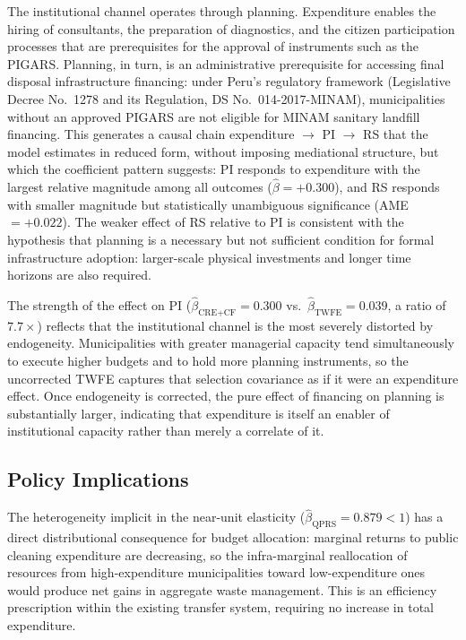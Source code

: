 The institutional channel operates through planning. Expenditure enables the hiring of consultants, the preparation of diagnostics, and the citizen participation processes that are prerequisites for the approval of instruments such as the PIGARS. Planning, in turn, is an administrative prerequisite for accessing final disposal infrastructure financing: under Peru's regulatory framework (Legislative Decree No.\ 1278 and its Regulation, DS No.\ 014-2017-MINAM), municipalities without an approved PIGARS are not eligible for MINAM sanitary landfill financing. This generates a causal chain expenditure $\to$ PI $\to$ RS that the model estimates in reduced form, without imposing mediational structure, but which the coefficient pattern suggests: PI responds to expenditure with the largest relative magnitude among all outcomes ($\hat{\beta} = +0.300$), and RS responds with smaller magnitude but statistically unambiguous significance (AME $= +0.022$). The weaker effect of RS relative to PI is consistent with the hypothesis that planning is a necessary but not sufficient condition for formal infrastructure adoption: larger-scale physical investments and longer time horizons are also required.

The strength of the effect on PI ($\hat{\beta}_{\text{CRE+CF}} = 0.300$ vs.\ $\hat{\beta}_{\text{TWFE}} = 0.039$, a ratio of $7.7\times$) reflects that the institutional channel is the most severely distorted by endogeneity. Municipalities with greater managerial capacity tend simultaneously to execute higher budgets and to hold more planning instruments, so the uncorrected TWFE captures that selection covariance as if it were an expenditure effect. Once endogeneity is corrected, the pure effect of financing on planning is substantially larger, indicating that expenditure is itself an enabler of institutional capacity rather than merely a correlate of it.

\subsection{Policy Implications}
\label{sec:politica}

The heterogeneity implicit in the near-unit elasticity ($\hat{\beta}_{\text{QPRS}} = 0.879 < 1$) has a direct distributional consequence for budget allocation: marginal returns to public cleaning expenditure are decreasing, so the infra-marginal reallocation of resources from high-expenditure municipalities toward low-expenditure ones would produce net gains in aggregate waste management. This is an efficiency prescription within the existing transfer system, requiring no increase in total expenditure.


